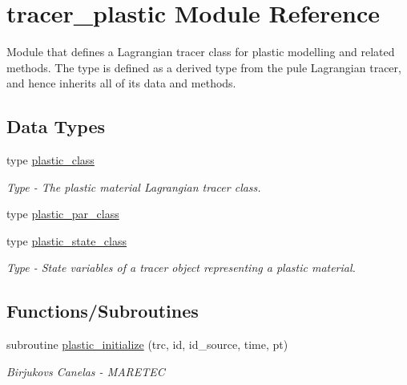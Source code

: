 \hypertarget{namespacetracer__plastic}{}\section{tracer\+\_\+plastic Module Reference}
\label{namespacetracer__plastic}


Module that defines a Lagrangian tracer class for plastic modelling and related methods. The type is defined as a derived type from the pule Lagrangian tracer, and hence inherits all of it\textquotesingle{}s data and methods.  


\subsection*{Data Types}
\begin{DoxyCompactItemize}
\item 
type \hyperlink{structtracer__plastic_1_1plastic__class}{plastic\+\_\+class}
\begin{DoxyCompactList}\small\item\em Type -\/ The plastic material Lagrangian tracer class. \end{DoxyCompactList}\item 
type \hyperlink{structtracer__plastic_1_1plastic__par__class}{plastic\+\_\+par\+\_\+class}
\item 
type \hyperlink{structtracer__plastic_1_1plastic__state__class}{plastic\+\_\+state\+\_\+class}
\begin{DoxyCompactList}\small\item\em Type -\/ State variables of a tracer object representing a plastic material. \end{DoxyCompactList}\end{DoxyCompactItemize}
\subsection*{Functions/\+Subroutines}
\begin{DoxyCompactItemize}
\item 
subroutine \hyperlink{namespacetracer__plastic_a9a4e16b71bcd88b95c80ddb9c3ddb7d1}{plastic\+\_\+initialize} (trc, id, id\+\_\+source, time, pt)
\begin{DoxyCompactList}\small\item\em Birjukovs Canelas -\/ M\+A\+R\+E\+T\+EC \end{DoxyCompactList}\end{DoxyCompactItemize}


